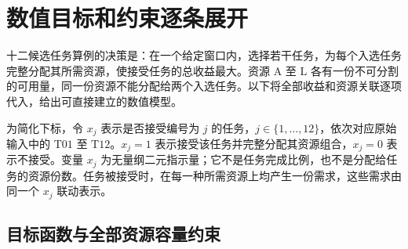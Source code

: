 \section{数值目标和约束逐条展开}
\label{sec:02_06}

十二候选任务算例的决策是：在一个给定窗口内，选择若干任务，为每个入选任务完整分配其所需资源，使接受任务的总收益最大。资源 $\mathrm{A}$ 至 $\mathrm{L}$ 各有一份不可分割的可用量，同一份资源不能分配给两个入选任务。以下将全部收益和资源关联逐项代入，给出可直接建立的数值模型。

为简化下标，令 $x_j$ 表示是否接受编号为 $j$ 的任务，$j\in\{1,\ldots,12\}$，依次对应原始输入中的 $\mathrm{T01}$ 至 $\mathrm{T12}$。$x_j=1$ 表示接受该任务并完整分配其资源组合，$x_j=0$ 表示不接受。变量 $x_j$ 为无量纲二元指示量；它不是任务完成比例，也不是分配给任务的资源份数。任务被接受时，在每一种所需资源上均产生一份需求，这些需求由同一个 $x_j$ 联动表示。

\subsection{目标函数与全部资源容量约束}

